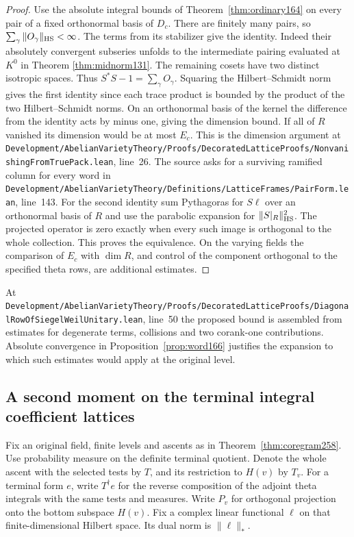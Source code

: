\documentclass[a4paper,11pt]{article}
\theoremstyle{definition}
\theoremstyle{remark}
\newcommand{\srcloc}[2]{{\small\nolinkurl{#1.lean}}, line~#2}
\numberwithin{equation}{section}
\begin{document}
\begin{proof}
Use the absolute integral bounds of Theorem~\ref{thm:ordinary164}
on every pair of a fixed orthonormal basis of \(D_c\).
There are finitely many pairs, so
\(\sum_\gamma\|O_\gamma\|_{\rm HS}<\infty\).
The terms from its stabilizer give the identity. Indeed their
absolutely convergent subseries unfolds to the intermediate
pairing evaluated at \(K^0\) in Theorem \ref{thm:midnorm131}.
The remaining cosets have two distinct isotropic spaces. Thus
\(S^*S-1=\sum_\gamma O_\gamma\). Squaring the Hilbert--Schmidt
norm gives the first identity since each trace product is
bounded by the product of the two Hilbert--Schmidt norms.
On an orthonormal basis of the kernel the difference from
the identity acts by minus one, giving the dimension bound.
If all of \(R\) vanished its dimension would be at most
\(E_c\). This is the dimension argument at
\srcloc{Development/AbelianVarietyTheory/Proofs/DecoratedLatticeProofs/NonvanishingFromTruePack}{26}.
The source asks for a surviving ramified column for every
word in \srcloc{Development/AbelianVarietyTheory/Definitions/LatticeFrames/PairForm}{143}.
For the second identity sum Pythagoras for \(S\ell\) over
an orthonormal basis of \(R\) and use the parabolic expansion
for \(\|S|_R\|_{\rm HS}^2\). The projected operator is zero
exactly when every such image is orthogonal to the whole
collection. This proves the equivalence. On the varying
fields the comparison of \(E_c\) with \(\dim R\), and control
of the component orthogonal to the specified theta rows,
are additional estimates.
\end{proof}

At \srcloc{Development/AbelianVarietyTheory/Proofs/DecoratedLatticeProofs/DiagonalRowOfSiegelWeilUnitary}{50}
the proposed bound is assembled from estimates for degenerate
terms, collisions and two corank-one contributions. Absolute
convergence in Proposition~\ref{prop:word166} justifies the
expansion to which such estimates would apply at the original
level.

\subsection{A second moment on the terminal integral coefficient lattices}\label{nav:VI-39}
Fix an original field, finite levels and ascents as in
Theorem~\ref{thm:coregram258}. Use probability measure on the
definite terminal quotient. Denote the whole ascent with the
selected tests by \(T\), and its restriction to \(H(v)\) by
\(T_v\). For a terminal form \(e\), write \(T^\dagger e\) for
the reverse composition of the adjoint theta integrals with
the same tests and measures. Write \(P_v\) for orthogonal
projection onto the bottom subspace \(H(v)\). Fix a complex
linear functional \(\ell\) on that finite-dimensional Hilbert
space. Its dual norm is \(\|\ell\|_*\).
\end{document}
